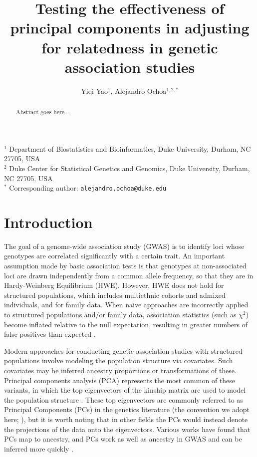 \documentclass[11pt]{article}
\title{\Large \textbf{Testing the effectiveness of principal components in adjusting for relatedness in genetic association studies}}
\author{Yiqi Yao$^1$, Alejandro Ochoa$^{1,2,*}$}
\date{}
\begin{document}
\maketitle

\noindent
$^1$ Department of Biostatistics and Bioinformatics, Duke University, Durham, NC 27705, USA \\
$^2$ Duke Center for Statistical Genetics and Genomics, Duke University, Durham, NC 27705, USA \\
$^*$ Corresponding author: \texttt{alejandro.ochoa@duke.edu}


\begin{abstract}
  Abstract goes here...
\end{abstract}

\clearpage

\tableofcontents

\clearpage
	
\section{Introduction} 

The goal of a genome-wide association study (GWAS) is to identify loci whose genotypes are correlated significantly with a certain trait.
An important assumption made by basic association tests is that genotypes at non-associated loci are drawn independently from a common allele frequency, so that they are in Hardy-Weinberg Equilibrium (HWE).
However, HWE does not hold for structured populations, which includes multiethnic cohorts and admixed individuals, and for family data.
When naive approaches are incorrectly applied to structured populations and/or family data, association statistics (such as $\chi^2$) become inflated relative to the null expectation, resulting in greater numbers of false positives than expected \citep{devlin_genomic_1999, voight_confounding_2005, astle_population_2009}.

Modern approaches for conducting genetic association studies with structured populations involve modeling the population structure via covariates.
Such covariates may be inferred ancestry proportions \citep{pritchard_association_2000} or transformations of these.
Principal components analysis (PCA) represents the most common of these variants, in which the top eigenvectors of the kinship matrix are used to model the population structure \citep{price_principal_2006}.
These top eigenvectors are commonly referred to as Principal Components (PCs) in the genetics literature (the convention we adopt here; \cite{patterson_population_2006}), but it is worth noting that in other fields the PCs would instead denote the projections of the data onto the eigenvectors.
Various works have found that PCs map to ancestry, and PCs work as well as ancestry in GWAS and can be inferred more quickly \citep{patterson_population_2006}.
\end{document}

